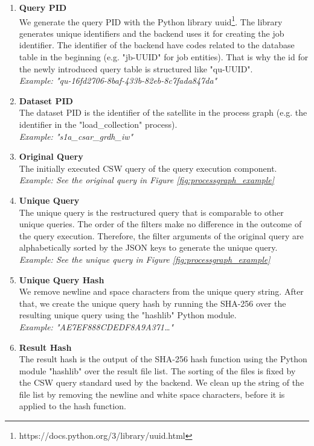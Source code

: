 \documentclass[draft,final]{vutinfth} %
\newcommand{\bgoesswein}[1]{{\color{blue}#1}}
\begin{document}
\begin{enumerate}
	\item \textbf{Query PID} \\
	We generate the query PID with the Python library uuid\footnote{https://docs.python.org/3/library/uuid.html}. The library generates unique identifiers and the backend uses it for creating the job identifier. The identifier of the backend have codes related to the database table in the beginning (e.g. "jb-UUID" for job entities). That is why the id for the newly introduced query table is structured like "qu-UUID". \\
	\textit{Example: "qu-16fd2706-8baf-433b-82eb-8c7fada847da"}
	\item \textbf{Dataset PID} \\ 
	The dataset PID is the identifier of the satellite in the process graph (e.g. the identifier in the "load\_collection" process). \\
	\textit{Example: "s1a\_csar\_grdh\_iw"}	    	
	\item\textbf{Original Query} \\
	The initially executed CSW query of the query execution component.  \\ 
	\textit{Example: See the original query in Figure \ref{fig:processgraph_example}}	 
	\item \textbf{Unique Query} \\
	The unique query is the restructured query that is comparable to other unique queries. The order of the filters make no difference in the outcome of the query execution. Therefore, the filter arguments of the original query are alphabetically sorted by the JSON keys to generate the unique query. \\
	\textit{Example: See the unique query in Figure \ref{fig:processgraph_example}}	  	 	
	\item \textbf{Unique Query Hash} \\ 
	We remove newline and space characters from the unique query string. After that, we create the unique query hash by running the SHA-256 over the resulting unique query using the "hashlib" Python module.  \\
	\textit{Example: "AE7EF888CDEDF8A9A371\dots"} 
	\item \textbf{Result Hash} \\
	The result hash is the output of the SHA-256 hash function using the Python module "hashlib" over the result file list. \bgoesswein{The sorting of the files is fixed by the CSW query standard used by the backend.} We clean up the string of the file list by removing the newline and white space characters, before it is applied to the hash function. \\

\end{enumerate}
\end{document}
